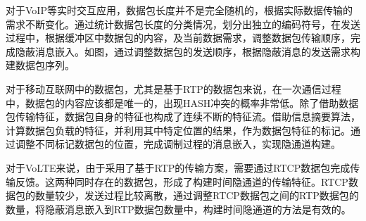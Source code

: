 
对于VoIP等实时交互应用，数据包长度并不是完全随机的，根据实际数据传输的需求不断变化。通过统计数据包长度的分类情况，划分出独立的编码符号，在发送过程中，根据缓冲区中数据包的内容，及当前数据需求，调整数据包传输顺序，完成隐蔽消息嵌入。如图，通过调整数据包的发送顺序，根据隐蔽消息的发送需求构建数据包序列。

对于移动互联网中的数据包，尤其是基于RTP的数据包来说，在一次通信过程中，数据包的内容应该都是唯一的，出现HASH冲突的概率非常低。除了借助数据包传输特征，数据包自身的特征也构成了连续不断的特征流。借助信息摘要算法，计算数据包负载的特征，并利用其中特定位置的结果，作为数据包特征的标记。通过调整不同标记数据包的位置，完成调制过程的消息嵌入，实现隐通道构建。

对于VoLTE来说，由于采用了基于RTP的传输方案，需要通过RTCP数据包完成传输反馈。这两种同时存在的数据包，形成了构建时间隐通道的传输特征。RTCP数据包的数量较少，发送过程比较离散，通过调整RTCP数据包之间的RTP数据包的数量，将隐蔽消息嵌入到RTP数据包数量中，构建时间隐通道的方法是有效的。


